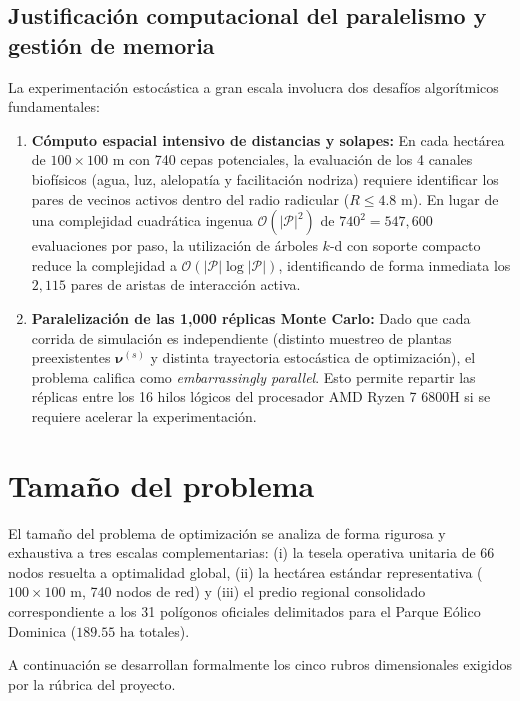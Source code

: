 \documentclass[11pt,a4paper]{article}
\begin{document}
\subsection{Justificación computacional del paralelismo y gestión de memoria}
La experimentación estocástica a gran escala involucra dos desafíos algorítmicos fundamentales:
\begin{enumerate}[leftmargin=1.5em]
    \item \textbf{Cómputo espacial intensivo de distancias y solapes:} En cada hectárea de $100\times 100\text{ m}$ con 740 cepas potenciales, la evaluación de los 4 canales biofísicos (agua, luz, alelopatía y facilitación nodriza) requiere identificar los pares de vecinos activos dentro del radio radicular ($R \le 4.8\text{ m}$). En lugar de una complejidad cuadrática ingenua $\mathcal{O}(|\mathcal{P}|^2)$ de $740^2 = 547,600$ evaluaciones por paso, la utilización de árboles $k$-d con soporte compacto reduce la complejidad a $\mathcal{O}(|\mathcal{P}| \log |\mathcal{P}|)$, identificando de forma inmediata los $2,115$ pares de aristas de interacción activa.
    \item \textbf{Paralelización de las 1,000 réplicas Monte Carlo:} Dado que cada corrida de simulación es independiente (distinto muestreo de plantas preexistentes $\boldsymbol{\nu}^{(s)}$ y distinta trayectoria estocástica de optimización), el problema califica como \textit{embarrassingly parallel}. Esto permite repartir las réplicas entre los 16 hilos lógicos del procesador AMD Ryzen 7 6800H si se requiere acelerar la experimentación.
\end{enumerate}

\section{Tamaño del problema}

El tamaño del problema de optimización se analiza de forma rigurosa y exhaustiva a tres escalas complementarias: (i) la tesela operativa unitaria de $66$ nodos resuelta a optimalidad global, (ii) la hectárea estándar representativa ($100\times 100\text{ m}$, 740 nodos de red) y (iii) el predio regional consolidado correspondiente a los 31 polígonos oficiales delimitados para el Parque Eólico Dominica ($189.55\text{ ha}$ totales).

A continuación se desarrollan formalmente los cinco rubros dimensionales exigidos por la rúbrica del proyecto.
\end{document}
